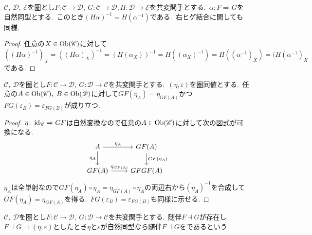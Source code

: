 \begin{lemma}
$\mathscr{C},\ \mathscr{D},\ \mathscr{E}$を圏とし$F \colon \mathscr{C} \to \mathscr{D},\ G \colon \mathscr{C} \to \mathscr{D}, H \colon \mathscr{D} \to \mathscr{E}$を共変関手とする.\
$\alpha \colon F \Rightarrow G$を自然同型とする.\
このとき$(H \alpha)^{-1} = H(\alpha^{-1})$である.\ 右ヒゲ結合に関しても同様.
\end{lemma}

\begin{proof}
任意の$X \in \operatorname{Ob}(\mathscr{C})$に対して$((H\alpha)^{-1})_X = ((H \alpha)_X)^{-1} = (H(\alpha_X))^{-1} = H((\alpha_X)^{-1}) = H((\alpha^{-1})_X) = (H(\alpha^{-1})_X$である.
\end{proof}

\begin{lemma}
$\mathscr{C},\ \mathscr{D}$を圏とし$F \colon \mathscr{C} \to \mathscr{D},\ G \colon \mathscr{D} \to \mathscr{C}$を共変関手とする.\
$(\eta,\varepsilon)$を圏同値とする.\
任意の$A \in \operatorname{Ob}(\mathscr{C}),\ B \in \operatorname{Ob}(\mathscr{D})$に対して$GF(\eta_A) = \eta_{GF(A)}$かつ$FG(\varepsilon_B) = \varepsilon_{FG(B)}$が成り立つ.
\end{lemma}

\begin{proof}
$\eta \colon \operatorname{id}_{\mathscr{C}} \Rightarrow GF$は自然変換なので任意の$A \in \operatorname{Ob}(\mathscr{C})$に対して次の図式が可換になる.
\[\begin{tikzcd}
	A & {GF(A)} \\
	{GF(A)} & {GFGF(A)}
	\arrow["{\eta_A}", from=1-1, to=1-2]
	\arrow["{\eta_A}"', from=1-1, to=2-1]
	\arrow["{GF(\eta_A)}", from=1-2, to=2-2]
	\arrow["{\eta_{GF(A)}}", from=2-1, to=2-2]
\end{tikzcd}\]
$\eta_A$は全単射なので$GF(\eta_A) \circ \eta_A = \eta_{GF(A)} \circ \eta_A$の両辺右から$(\eta_A)^{-1}$を合成して$GF(\eta_A) = \eta_{GF(A)}$を得る.\ $FG(\varepsilon_B) = \varepsilon_{FG(B)}$も同様に示せる.
\end{proof}

\begin{definition} \label{def: IsAdjointEquivalence}
$\mathscr{C},\ \mathscr{D}$を圏とし$F \colon \mathscr{C} \to \mathscr{D},\ G \colon \mathscr{D} \to \mathscr{C}$を共変関手とする.\
随伴$F \dashv G$が存在し$F \dashv G \eqcolon (\eta, \varepsilon)$としたとき$\eta$と$\varepsilon$が自然同型なら随伴$F \dashv G$をであるという.
\end{definition}

